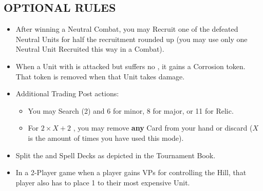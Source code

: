 \begin{multicols}{2}
\subsection*{\MakeUppercase{Optional Rules}}
\begin{itemize}
  \item After winning a Neutral Combat, you may Recruit one of the defeated Neutral Units for half the recruitment  rounded up (you may use only one Neutral Unit Recruited this way in a Combat).  %
  \item When a Unit with  is attacked but suffers no , it gains a Corrosion token. That token is removed when that Unit takes damage.
  \item Additional Trading Post actions:
  \begin{itemize}
    \item You may Search (2)  and  6  for minor, 8  for major, or 11  for Relic.
    \item For $2×X+2$ , you may remove \textbf{any} Card from your hand or discard ($X$is the amount of times you have used this mode).
  \end{itemize}
  \item Split the  and Spell Decks as depicted in the Tournament Book.
  \item In a 2-Player game when a player gains VPs for controlling the Hill, that player also has to place 1  to their most expensive Unit.
\end{itemize}

\end{multicols}

